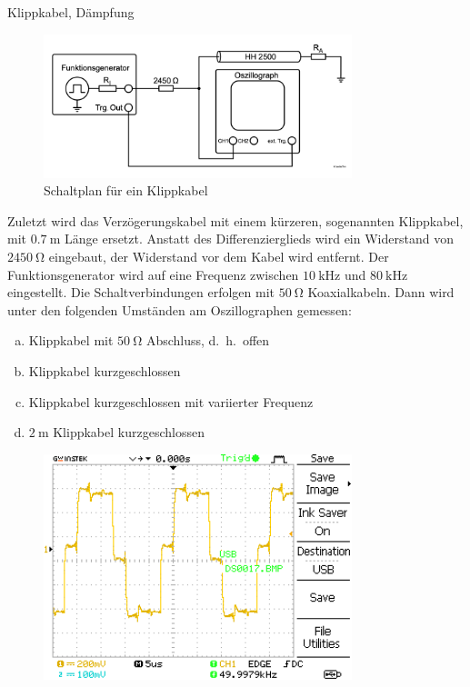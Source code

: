 \documentclass[ngerman]{scrartcl}
\theoremstyle{definition}
\begin{document}
		\begin{aufgabe}{Klippkabel, Dämpfung}
			\begin{figure}[H]
				\centering
				\includegraphics[width=0.8\textwidth]{figs/Aufbau_1_4_Klippkabel.png}
				\caption{Schaltplan für ein Klippkabel~\cite{anleitung}}
				\label{fig:aufbau_1_4_klippkabel}
			\end{figure}
			Zuletzt wird das Verzögerungskabel mit einem kürzeren, sogenannten Klippkabel, mit $\SI{0.7}{\meter}$ Länge ersetzt. Anstatt des Differenzierglieds wird ein Widerstand von $\SI{2450}{\ohm}$ eingebaut, der Widerstand vor dem Kabel wird entfernt. Der Funktionsgenerator wird auf eine Frequenz zwischen $\SI{10}{\kilo\hertz}$ und $\SI{80}{\kilo\hertz}$ eingestellt. Die Schaltverbindungen erfolgen mit $\SI{50}{\ohm}$ Koaxialkabeln. Dann wird unter den folgenden Umständen am Oszillographen gemessen:
			\begin{enumerate}[(a)]
				\item Klippkabel mit $\SI{50}{\ohm}$ Abschluss, d.\ h.\ offen
				\item Klippkabel kurzgeschlossen
				\item Klippkabel kurzgeschlossen mit variierter Frequenz
				\item $\SI{2}{\meter}$ Klippkabel kurzgeschlossen 
			\end{enumerate}
			\MesswUndAusw
			\begin{unteraufgabe}
				\begin{figure}[H]
					\centering
					\includegraphics[width=0.8\textwidth]{MesswerteVersuch1/DS0017.png}

\end{figure}
\end{unteraufgabe}
\end{aufgabe}
\end{document}
